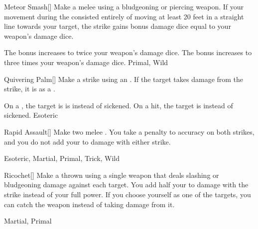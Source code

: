 \lowercase{\hypertarget{maneuver:Meteor Smash}{}}\label{maneuver:Meteor Smash}
\hypertarget{maneuver:Meteor Smash}{}
\begin{freeability}[Rank 3]{Meteor Smash}[]
Make a melee  using a bludgeoning or piercing weapon.
If your movement during the  consisted entirely of moving at least 20 feet in a straight line towards your target, the strike gains bonus damage dice equal to your weapon's damage dice.

\rankline
{} The bonus increases to twice your weapon's damage dice.
 The bonus increases to three times your weapon's damage dice.
 Primal, Wild
\end{freeability}
\vspace{0.25em}



\lowercase{\hypertarget{maneuver:Quivering Palm}{}}\label{maneuver:Quivering Palm}
\hypertarget{maneuver:Quivering Palm}{}
\begin{freeability}[Rank 3]{Quivering Palm}[]
Make a strike using an .
If the target takes damage from the strike, it is  as a .

\rankline
{} On a , the target is is  instead of sickened.
 On a hit, the target is  instead of sickened.
 Esoteric
\end{freeability}
\vspace{0.25em}



\lowercase{\hypertarget{maneuver:Rapid Assault}{}}\label{maneuver:Rapid Assault}
\hypertarget{maneuver:Rapid Assault}{}
\begin{freeability}[Rank 3]{Rapid Assault}[]
Make two melee .
You take a  penalty to accuracy on both strikes, and you do not add your  to damage with either strike.


 Esoteric, Martial, Primal, Trick, Wild
\end{freeability}
\vspace{0.25em}



\lowercase{\hypertarget{maneuver:Ricochet}{}}\label{maneuver:Ricochet}
\hypertarget{maneuver:Ricochet}{}
\begin{freeability}[Rank 3]{Ricochet}[]
Make a thrown  using a single weapon that deals slashing or bludgeoning damage against each target.
You add half your  to damage with the strike instead of your full power.
If you choose yourself as one of the targets, you can catch the weapon instead of taking damage from it.


 Martial, Primal
\end{freeability}
\vspace{0.25em}




